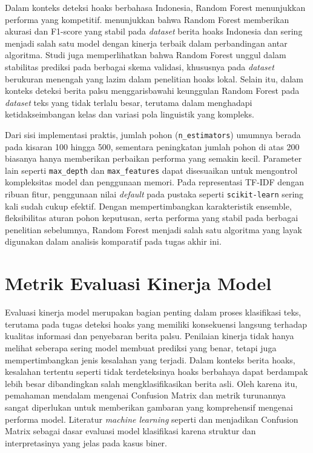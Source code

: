 Dalam konteks deteksi hoaks berbahasa Indonesia, Random Forest menunjukkan performa yang kompetitif. \textcite{triyono2023indonesian} menunjukkan bahwa Random Forest memberikan akurasi dan F1-score yang stabil pada \textit{dataset} berita hoaks Indonesia dan sering menjadi salah satu model dengan kinerja terbaik dalam perbandingan antar algoritma. Studi \textcite{safira2023comparative} juga memperlihatkan bahwa Random Forest unggul dalam stabilitas prediksi pada berbagai skema validasi, khususnya pada \textit{dataset} berukuran menengah yang lazim dalam penelitian hoaks lokal. Selain itu, \textcite{alguttarensemble2024optimized} dalam konteks deteksi berita palsu menggarisbawahi keunggulan Random Forest pada \textit{dataset} teks yang tidak terlalu besar, terutama dalam menghadapi ketidakseimbangan kelas dan variasi pola linguistik yang kompleks.

Dari sisi implementasi praktis, jumlah pohon (\texttt{n\_estimators}) umumnya berada pada kisaran 100 hingga 500, sementara peningkatan jumlah pohon di atas 200 biasanya hanya memberikan perbaikan performa yang semakin kecil. Parameter lain seperti \texttt{max\_depth} dan \texttt{max\_features} dapat disesuaikan untuk mengontrol kompleksitas model dan penggunaan memori. Pada representasi TF-IDF dengan ribuan fitur, penggunaan nilai \textit{default} pada pustaka seperti \texttt{scikit-learn} sering kali sudah cukup efektif. Dengan mempertimbangkan karakteristik ensemble, fleksibilitas aturan pohon keputusan, serta performa yang stabil pada berbagai penelitian sebelumnya, Random Forest menjadi salah satu algoritma yang layak digunakan dalam analisis komparatif pada tugas akhir ini.

\section{Metrik Evaluasi Kinerja Model}

Evaluasi kinerja model merupakan bagian penting dalam proses klasifikasi teks, terutama pada tugas deteksi hoaks yang memiliki konsekuensi langsung terhadap kualitas informasi dan penyebaran berita palsu. Penilaian kinerja tidak hanya melihat seberapa sering model membuat prediksi yang benar, tetapi juga mempertimbangkan jenis kesalahan yang terjadi. Dalam konteks berita hoaks, kesalahan tertentu seperti tidak terdeteksinya hoaks berbahaya dapat berdampak lebih besar dibandingkan salah mengklasifikasikan berita asli. Oleh karena itu, pemahaman mendalam mengenai Confusion Matrix dan metrik turunannya sangat diperlukan untuk memberikan gambaran yang komprehensif mengenai performa model. Literatur \textit{machine learning} seperti \textcite{Alghamdi2022info13120576} dan \textcite{alghamdi2024comprehensive} menjadikan Confusion Matrix sebagai dasar evaluasi model klasifikasi karena struktur dan interpretasinya yang jelas pada kasus biner.

